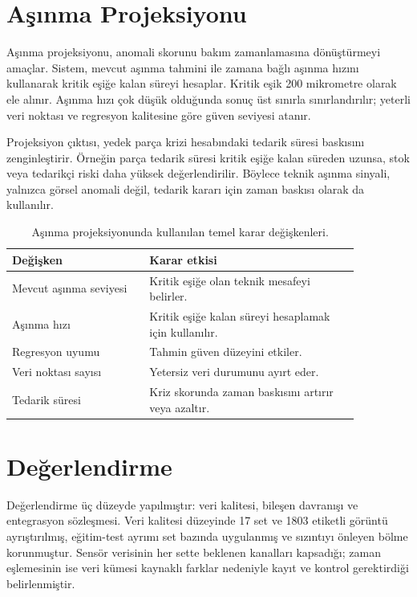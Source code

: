 \documentclass[conference]{IEEEtran}
\begin{document}
\section{Aşınma Projeksiyonu}
Aşınma projeksiyonu, anomali skorunu bakım zamanlamasına dönüştürmeyi amaçlar. Sistem, mevcut aşınma tahmini ile zamana bağlı aşınma hızını kullanarak kritik eşiğe kalan süreyi hesaplar. Kritik eşik 200 mikrometre olarak ele alınır. Aşınma hızı çok düşük olduğunda sonuç üst sınırla sınırlandırılır; yeterli veri noktası ve regresyon kalitesine göre güven seviyesi atanır.

Projeksiyon çıktısı, yedek parça krizi hesabındaki tedarik süresi baskısını zenginleştirir. Örneğin parça tedarik süresi kritik eşiğe kalan süreden uzunsa, stok veya tedarikçi riski daha yüksek değerlendirilir. Böylece teknik aşınma sinyali, yalnızca görsel anomali değil, tedarik kararı için zaman baskısı olarak da kullanılır.

\begin{table}[H]
\centering
\caption{Aşınma projeksiyonunda kullanılan temel karar değişkenleri.}
\label{tab:projection}
\begin{tabular}{p{0.34\linewidth}p{0.52\linewidth}}
\toprule
Değişken & Karar etkisi \\
\midrule
Mevcut aşınma seviyesi & Kritik eşiğe olan teknik mesafeyi belirler. \\
Aşınma hızı & Kritik eşiğe kalan süreyi hesaplamak için kullanılır. \\
Regresyon uyumu & Tahmin güven düzeyini etkiler. \\
Veri noktası sayısı & Yetersiz veri durumunu ayırt eder. \\
Tedarik süresi & Kriz skorunda zaman baskısını artırır veya azaltır. \\
\bottomrule
\end{tabular}
\end{table}

\section{Değerlendirme}
Değerlendirme üç düzeyde yapılmıştır: veri kalitesi, bileşen davranışı ve entegrasyon sözleşmesi. Veri kalitesi düzeyinde 17 set ve 1803 etiketli görüntü ayrıştırılmış, eğitim-test ayrımı set bazında uygulanmış ve sızıntıyı önleyen bölme korunmuştur. Sensör verisinin her sette beklenen kanalları kapsadığı; zaman eşlemesinin ise veri kümesi kaynaklı farklar nedeniyle kayıt ve kontrol gerektirdiği belirlenmiştir.
\end{document}
